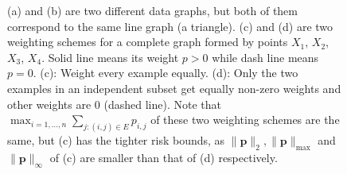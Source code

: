 \documentclass[letterpaper]{article} %
\def\SingleColumnEnd{}
\newcommand{\probdistri}{\mathbf{p}}
\newcommand{\pair}[1]{(#1)}
\begin{document}
\begin{figure}[h]
{    }\hspace{11ex}
    \hspace{5ex}
  \SingleColumnEnd
    \caption{(a) and (b) are two different data graphs, but both of them correspond to the same line graph (a triangle). 
    (c) and (d) are two weighting schemes for a complete graph formed by points $X_1$, $X_2$, $X_3$, $X_4$. Solid line means its weight $p>0$ while dash line means $p=0$. (c): Weight every example equally. (d): Only the two examples in an independent subset get equally non-zero weights and other weights are $0$ (dashed line). Note that $\max_{i=1,\dots,n} \sum_{j:\pair{i,j}\in E} p_{i,j}$ of these two weighting schemes are the same, but (c) has the tighter risk bounds, as $\|\probdistri{}\|_2, \|\probdistri{}\|_\max$ and $\|\probdistri{}\|_\infty$ of (c) are smaller than that of (d) respectively.}
    \label{fig:weighting_scheme_complete_graph}
\end{figure}

\end{document}
